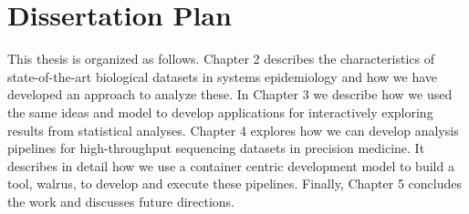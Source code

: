 % 
%          
%          
%          
%          
% 
%          


\section{Dissertation Plan} 
This thesis is organized as follows. Chapter 2 describes the characteristics of
state-of-the-art biological datasets in systems epidemiology and how we have
developed an approach to analyze these. 
In Chapter 3 we describe how we used the same ideas and model to develop
applications for interactively exploring results from statistical analyses.
Chapter 4 explores how we can develop analysis pipelines for high-throughput
sequencing datasets in precision medicine. It describes in detail how we use a
container centric development model to build a tool, walrus, to develop and
execute these pipelines.
Finally, Chapter 5 concludes the work and discusses future directions. 

